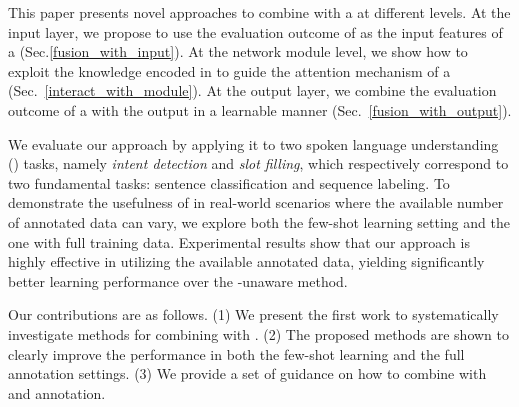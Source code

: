 This paper presents novel approaches to combine \REs with a \NN at different levels.  At the input layer, we propose to use the evaluation
outcome of \REs as the input features of a \NN (Sec.\ref{fusion_with_input}). At the network module level, we show how to exploit the
knowledge encoded in \REs to guide the attention mechanism of a \NN (Sec.~\ref{interact_with_module}). At the output layer, we combine the
evaluation outcome of a \RE with the \NN output in a learnable manner (Sec.~\ref{fusion_with_output}).

%
We evaluate our approach by applying it to two spoken language understanding (\SLU) tasks, namely \emph{intent detection} and \emph{slot
filling}, which respectively correspond to two fundamental \NLP tasks: sentence classification and sequence labeling. To demonstrate the
usefulness of \REs in real-world scenarios where the available number of annotated data can vary, we explore both the few-shot learning
setting and the one with full training data. Experimental results show that our approach is highly effective in utilizing the available
annotated data, yielding significantly better learning performance over the \RE-unaware method.




Our contributions are as follows. (1) We present the first work to systematically investigate methods for combining \REs with \NNs. (2) The
proposed methods are shown to clearly improve the \NN performance in both the few-shot learning and the full annotation settings. (3) We
provide a set of guidance on how to combine \REs with \NNs and \RE annotation.
